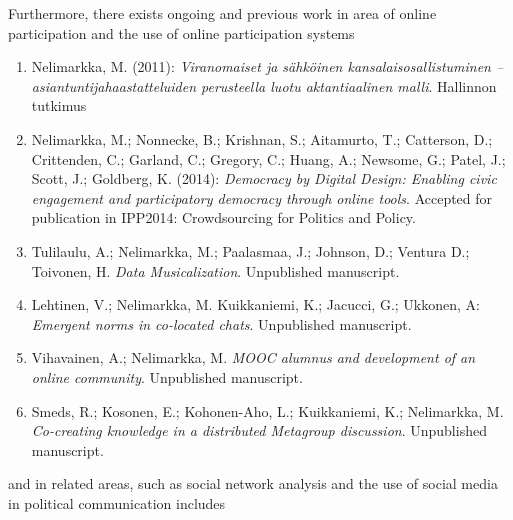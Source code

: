 \documentclass{article}
\begin{document}
Furthermore, there exists ongoing and previous work in area of online participation and the use of online participation systems

\begin{enumerate}
\item Nelimarkka, M. (2011): \textit{Viranomaiset ja sähköinen kansalaisosallistuminen -- asiantuntijahaastatteluiden perusteella luotu aktantiaalinen malli}. Hallinnon tutkimus
\item Nelimarkka, M.; Nonnecke, B.; Krishnan, S.; Aitamurto, T.;  Catterson, D.; Crittenden, C.; Garland, C.; Gregory, C.; Huang, A.; Newsome, G.; Patel, J.; Scott, J.; Goldberg, K. (2014): \textit{Democracy by Digital Design: Enabling civic engagement and participatory democracy through online tools}. Accepted for publication in IPP2014: Crowdsourcing for Politics and Policy.
\item Tulilaulu, A.; Nelimarkka, M.; Paalasmaa, J.; Johnson, D.; Ventura D.; Toivonen, H. \textit{Data Musicalization}. Unpublished manuscript.
\item Lehtinen, V.; Nelimarkka, M. Kuikkaniemi, K.; Jacucci, G.; Ukkonen, A: \textit{Emergent norms in co-located chats}. Unpublished manuscript.
\item Vihavainen, A.; Nelimarkka, M. \textit{MOOC alumnus and development of an online community}. Unpublished manuscript.
\item Smeds, R.; Kosonen, E.; Kohonen-Aho, L.; Kuikkaniemi, K.; Nelimarkka, M. \textit{Co-creating knowledge in a distributed Metagroup discussion}. Unpublished manuscript.
\end{enumerate}

and in related areas, such as social network analysis and the use of social media in political communication includes
\end{document}
